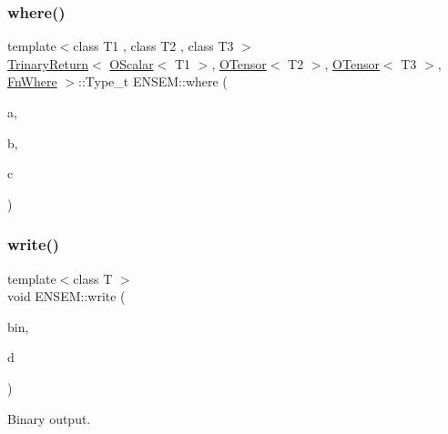 \subsubsection{\texorpdfstring{where()}{where()}}
{\footnotesize\ttfamily template$<$class T1 , class T2 , class T3 $>$ \\
\mbox{\hyperlink{structENSEM_1_1TrinaryReturn}{Trinary\+Return}}$<$ \mbox{\hyperlink{classENSEM_1_1OScalar}{O\+Scalar}}$<$ T1 $>$, \mbox{\hyperlink{classENSEM_1_1OTensor}{O\+Tensor}}$<$ T2 $>$, \mbox{\hyperlink{classENSEM_1_1OTensor}{O\+Tensor}}$<$ T3 $>$, \mbox{\hyperlink{structENSEM_1_1FnWhere}{Fn\+Where}} $>$\+::Type\+\_\+t E\+N\+S\+E\+M\+::where (\begin{DoxyParamCaption}\item[{const \mbox{\hyperlink{classENSEM_1_1OScalar}{O\+Scalar}}$<$ T1 $>$ \&}]{a,  }\item[{const \mbox{\hyperlink{classENSEM_1_1OTensor}{O\+Tensor}}$<$ T2 $>$ \&}]{b,  }\item[{const \mbox{\hyperlink{classENSEM_1_1OTensor}{O\+Tensor}}$<$ T3 $>$ \&}]{c }\end{DoxyParamCaption})\hspace{0.3cm}{\ttfamily [inline]}}

\mbox{\label{group__obstensor_gaef90d8549fa5fa0469beb39b348ca8fd}} 
\subsubsection{\texorpdfstring{write()}{write()}}
{\footnotesize\ttfamily template$<$class T $>$ \\
void E\+N\+S\+E\+M\+::write (\begin{DoxyParamCaption}\item[{\mbox{\hyperlink{classADATIO_1_1BinaryWriter}{A\+D\+A\+T\+I\+O\+::\+Binary\+Writer}} \&}]{bin,  }\item[{const \mbox{\hyperlink{classENSEM_1_1OTensor}{O\+Tensor}}$<$ T $>$ \&}]{d }\end{DoxyParamCaption})\hspace{0.3cm}{\ttfamily [inline]}}



Binary output. 


